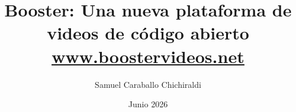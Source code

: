 \newcommand{\Estudios}{Grado}

\newcommand{\TituloEstudios}{Ingeniería Informática}

\newcommand{\Departamento}{Departamento de Arquitectura y Tecnologia de Sistemas Informaticos}

\newcommand{\NombreAutor}{Samuel Caraballo Chichiraldi}

\newcommand{\NombreTutor}{Fernando Pérez Costoya}

\newcommand{\TituloTFG}{Booster: Una nueva plataforma de videos de código abierto \href{http://boostervideos.net}{\underline{www.boostervideos.net}}}

\newcommand{\Fecha}{Junio 2026}

\title{\TituloTFG}
\author{\NombreAutor}
\date{\Fecha}
